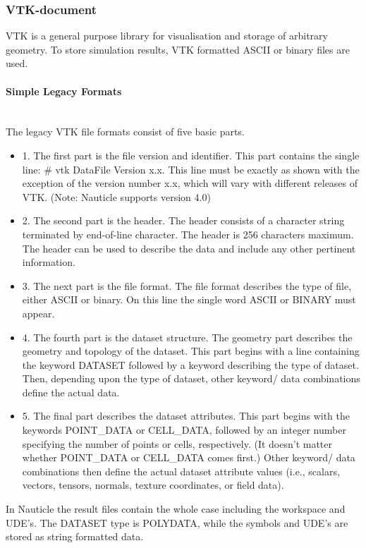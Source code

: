 \documentclass[a4paper,12pt,openany]{book}
\newcommand{\myparagraph}[1]{\paragraph{#1}\mbox{}\\}
\theoremstyle{break}
\begin{document}
\subsubsection{VTK-document}
VTK is a general purpose library for visualisation and storage of arbitrary geometry. To store simulation results, VTK formatted ASCII or binary files are used.
\myparagraph{Simple Legacy Formats}
The legacy VTK file formats consist of five basic parts.
\begin{itemize}
\item 1. The first part is the file version and identifier. This part contains the single line: \# vtk DataFile Version x.x. This line must be exactly as shown with the exception of the version number x.x, which will vary with different releases of VTK. (Note: Nauticle supports version 4.0) 
\item 2. The second part is the header. The header consists of a character string terminated by end-of-line character. The header is 256 characters maximum. The header can be used to describe the data and include any other pertinent information. 
\item 3. The next part is the file format. The file format describes the type of file, either ASCII or binary. On this line the single word ASCII or BINARY must appear. 
\item 4. The fourth part is the dataset structure. The geometry part describes the geometry and topology of the dataset. This part begins with a line containing the keyword DATASET followed by a keyword describing the type of dataset. Then, depending upon the type of dataset, other keyword/ data combinations define the actual data.
\item 5. The final part describes the dataset attributes. This part begins with the keywords POINT\_DATA or CELL\_DATA, followed by an integer number specifying the number of points or cells, respectively. (It doesn't matter whether POINT\_DATA or CELL\_DATA comes first.) Other keyword/ data combinations then define the actual dataset attribute values (i.e., scalars, vectors, tensors, normals, texture coordinates, or field data). 
\end{itemize}
In Nauticle the result files contain the whole case including the workspace and UDE's. The DATASET type is POLYDATA, while the symbols and UDE's are stored as string formatted data.
\end{document}
